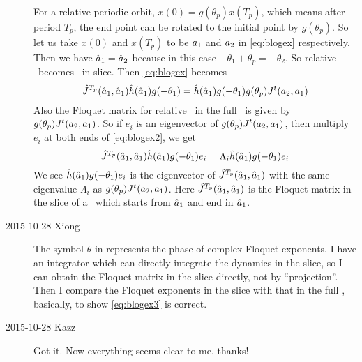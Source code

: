\begin{description}
For a relative periodic orbit, $x(0)=g(\theta_p)x(T_{p})$, which means
after period $T_p$, the end point can be rotated to the initial point
by $g(\theta_p)$. So let us take $x(0)$ and $x(T_p)$ to be
$a_1$ and $a_2$ in \eqref{eq:blogex} respectively. Then we have
$\hat{a}_1 = \hat{a}_2$ because in this case
$ -\theta_1 + \theta_p = -\theta_2$. So relative \po\ becomes \po\
in slice. Then \eqref{eq:blogex} becomes
\begin{equation}
  \hat{J}^{T_p}(\hat{a}_1,\hat{a}_1)\hat{h}
  (\hat{a}_1)g(-\theta_{1})=
  \hat{h}(\hat{a}_1)g(-\theta_{1})g(\theta_p)J^t(a_2,a_1)
  \label{eq:blogex2}
\end{equation}
Also the Floquet matrix for relative \po\ in the full \statesp\ is given
by $g(\theta_p)J^t(a_2,a_1)$. So if $e_i$ is an eigenvector of
$g(\theta_p)J^t(a_2,a_1)$, then multiply $e_i$ at both
ends of \eqref{eq:blogex2}, we get
\begin{equation}
  \hat{J}^{T_p}(\hat{a}_1,\hat{a}_1)\hat{h}
  (\hat{a}_1)g(-\theta_{1}) e_i=
  \Lambda_i \hat{h}(\hat{a}_1)g(-\theta_{1}) e_i
  \label{eq:blogex3}
\end{equation}
We see $\hat{h}(\hat{a}_1)g(-\theta_{1}) e_i$ is the eigenvector
of $\hat{J}^{T_p}(\hat{a}_1,\hat{a}_1)$ with the same eigenvalue
$\Lambda_i$ as $g(\theta_p)J^t(a_2,a_1)$. Here
$\hat{J}^{T_p}(\hat{a}_1,\hat{a}_1)$ is the Floquet matrix in the slice
of a \po\ which starts from $\hat{a}_1$ and end in $\hat{a}_1$.

\item[2015-10-28 Xiong]
The symbol $\theta$  in  represents the phase of
complex Floquet exponents. I have an integrator which can directly
integrate the dynamics in the slice, so I can obtain the Floquet matrix
in the slice directly, not by ``projection''. Then I compare the Floquet
exponents in the slice with that in the full \statesp, basically, to show
\eqref{eq:blogex3} is correct.

\item[2015-10-28 Kazz]
Got it. Now everything seems clear to me, thanks!


\end{description}
